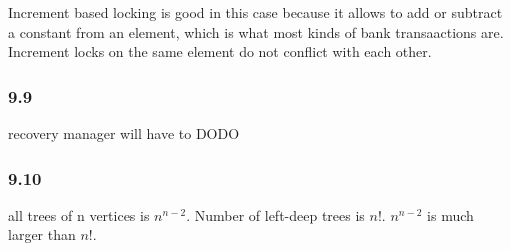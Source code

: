 \documentclass{article}
\begin{document}
Increment based locking is good in this case because it allows to add or subtract a constant
from an element, which is what most kinds of bank transaactions are. Increment locks on the same
element do not conflict with each other.
\subsubsection{9.9}
recovery manager will have to DODO
\subsubsection{9.10}
all trees of n vertices is $n^{n-2}$. Number of left-deep trees is $n!$.
$n^{n-2}$ is much larger than $n!$.
\end{document}
